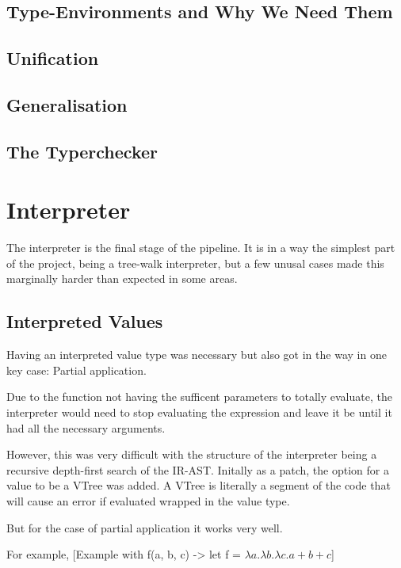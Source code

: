 \documentclass{l4proj}
\begin{document}
\subsection{Type-Environments and Why We Need Them}
\subsection{Unification}
\subsection{Generalisation}
\subsection{The Typerchecker}


\section{Interpreter}

The interpreter is the final stage of the pipeline.
It is in a way the simplest part of the project, being a tree-walk interpreter, but a few unusal cases made this marginally harder than expected in some areas.

\subsection{Interpreted Values}

Having an interpreted value type was necessary but also got in the way in one key case: Partial application.

Due to the function not having the sufficent parameters to totally evaluate, the interpreter would need to stop evaluating the expression and leave it be until it had all the necessary arguments.

However, this was very difficult with the structure of the interpreter being a recursive depth-first search of the IR-AST.
Initally as a patch, the option for a value to be a VTree was added.
A VTree is literally a segment of the code that will cause an error if evaluated wrapped in the value type.

But for the case of partial application it works very well.

For example, [Example with f(a, b, c) -> let f = $\lambda a. \lambda b. \lambda c. a + b + c$]
\end{document}
